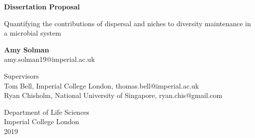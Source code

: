 \begin{titlepage}
   \begin{center}
       \vspace*{1cm}
 	\Huge
       \textbf{Dissertation Proposal}
 
       \vspace{0.5cm}
       \Huge
        Quantifying the contributions of dispersal and niches to diversity maintenance in a microbial system
 
       \vspace{1.5cm}
 	\huge
       \textbf{Amy Solman} \\
       amy.solman19@imperial.ac.uk
 
       \vfill
       \Large
 	Supervisors\\
         Tom Bell, Imperial College London, thomas.bell@imperial.ac.uk \\
        Ryan Chisholm, National University of Singapore, ryan.chis@gmail.com 
 
       \vspace{0.8cm}
 

 	\Large
       Department of Life Sciences\\
       Imperial College London\\
       2019
 
   \end{center}
\end{titlepage}